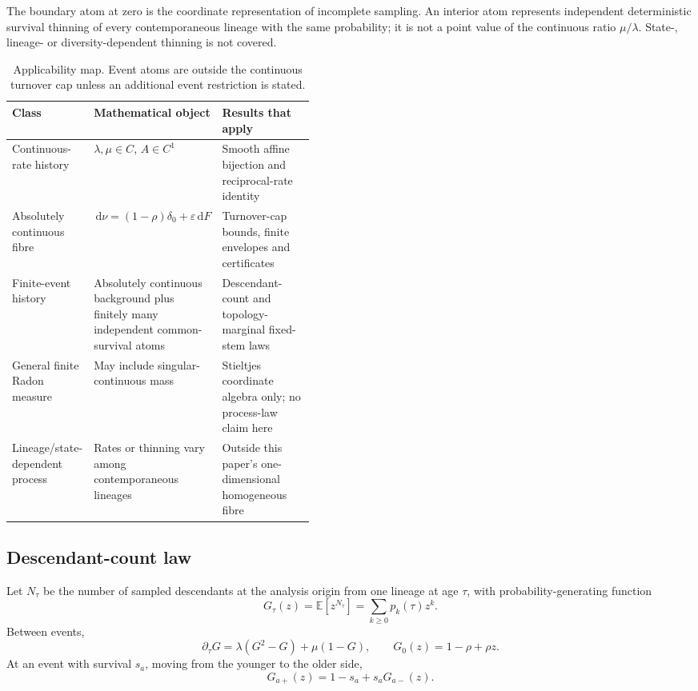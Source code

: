 \documentclass[11pt]{article}
\theoremstyle{definition}
\newcommand{\dd}{\,\mathrm{d}}
\begin{document}
The boundary atom at zero is the coordinate representation of incomplete sampling. An interior atom represents independent deterministic survival thinning of every contemporaneous lineage with the same probability; it is not a point value of the continuous ratio $\mu/\lambda$. State-, lineage- or diversity-dependent thinning is not covered.

\begin{table}[H]
\centering
\small
\renewcommand{\arraystretch}{1.08}
\begin{tabularx}{\linewidth}{@{}p{0.19\linewidth}p{0.25\linewidth}X@{}}
\toprule
Class & Mathematical object & Results that apply \\
\midrule
Continuous-rate history & $\lambda,\mu\in C$, $A\in C^1$ & Smooth affine bijection and reciprocal-rate identity \\
Absolutely continuous fibre & $\dd\nu=(1-\rho)\delta_0+\varepsilon\dd F$ & Turnover-cap bounds, finite envelopes and certificates \\
Finite-event history & Absolutely continuous background plus finitely many independent common-survival atoms & Descendant-count and topology-marginal fixed-stem laws \\
General finite Radon measure & May include singular-continuous mass & Stieltjes coordinate algebra only; no process-law claim here \\
Lineage/state-dependent process & Rates or thinning vary among contemporaneous lineages & Outside this paper's one-dimensional homogeneous fibre \\
\bottomrule
\end{tabularx}
\caption{Applicability map. Event atoms are outside the continuous turnover cap unless an additional event restriction is stated.}
\label{tab:modelclasses}
\end{table}

\subsection{Descendant-count law}
Let $N_\tau$ be the number of sampled descendants at the analysis origin from one lineage at age $\tau$, with probability-generating function
\[
 G_\tau(z)=\mathbb E[z^{N_\tau}]=\sum_{k\geq0}p_k(\tau)z^k.
\]
Between events,
\begin{equation}
 \partial_\tau G=\lambda(G^2-G)+\mu(1-G),\qquad
 G_0(z)=1-\rho+\rho z. \label{eq:pgf}
\end{equation}
At an event with survival $s_a$, moving from the younger to the older side,
\begin{equation}
 G_{a+}(z)=1-s_a+s_aG_{a-}(z). \label{eq:pgfevent}
\end{equation}
\end{document}
